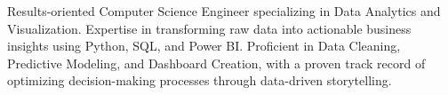 Results-oriented Computer Science Engineer specializing in Data Analytics and Visualization. Expertise in transforming raw data into actionable business insights using Python, SQL, and Power BI. Proficient in Data Cleaning, Predictive Modeling, and Dashboard Creation, with a proven track record of optimizing decision-making processes through data-driven storytelling.
